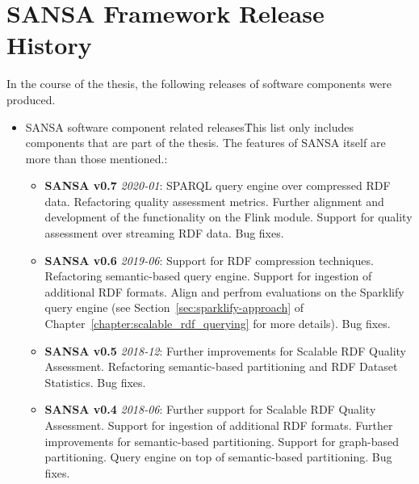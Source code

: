 \chapter{SANSA Framework Release History}
\label{sec:appendix-sansa-releases}

In the course of the thesis, the following releases of software components were produced.

\begin{itemize}
    \item SANSA software component related releases\f{This list only includes components that are part of the thesis. 
    The features of SANSA itself are more than those mentioned.}:
    \begin{itemize}
        
        \item \textbf{SANSA v0.7} \textit{2020-01}:
        SPARQL query engine over compressed RDF data.
        Refactoring quality assessment metrics.
        Further alignment and development of the functionality on the Flink module.
        Support for quality assessment over streaming RDF data.
        Bug fixes.
        
        \item \textbf{SANSA v0.6} \textit{2019-06}:
        Support for RDF compression techniques.
        Refactoring semantic-based query engine.
        Support for ingestion of additional RDF formats.
        Align and perfrom evaluations on the Sparklify query engine (see Section~\ref{sec:sparklify-approach} of Chapter~\ref{chapter:scalable_rdf_querying} for more details).
        Bug fixes.
        
        \item \textbf{SANSA v0.5} \textit{2018-12}: 
        Further improvements for Scalable RDF Quality Assessment. 
        Refactoring semantic-based partitioning and RDF Dataset Statistics.
        Bug fixes.
        
        \item \textbf{SANSA v0.4} \textit{2018-06}:
        Further support for Scalable RDF Quality Assessment. 
        Support for ingestion of additional RDF formats.
        Further improvements for semantic-based partitioning.
        Support for graph-based partitioning.
        Query engine on top of semantic-based partitioning.
        Bug fixes.
        

\end{itemize}
\end{itemize}
